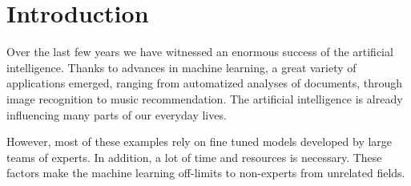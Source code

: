 \chapter*{Introduction}

Over the last few years we have witnessed an enormous success of the artificial
intelligence. Thanks to advances in machine learning, a great variety of
applications emerged, ranging from automatized analyses of documents, through
image recognition to music recommendation. The artificial intelligence is already
influencing many parts of our everyday lives.

However, most of these examples rely on fine tuned models developed by large
teams of experts. In addition, a lot of time and resources is necessary. These
factors make the machine learning off-limits to non-experts from unrelated
fields. %